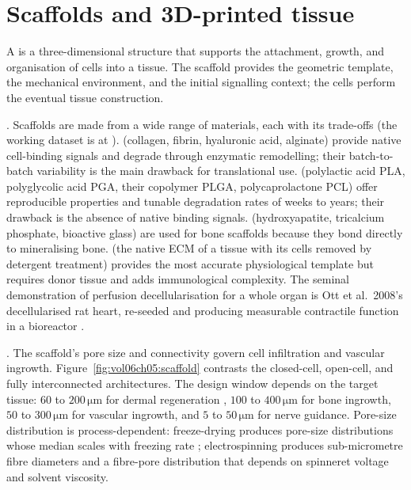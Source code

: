 \section{Scaffolds and 3D-printed tissue}

A  is a three-dimensional structure that supports
the attachment, growth, and organisation of cells into a tissue. The
scaffold provides the geometric template, the mechanical environment,
and the initial signalling context; the cells perform the eventual
tissue construction.

. Scaffolds are made from a wide range of
materials, each with its trade-offs (the working dataset is at
). 
(collagen, fibrin, hyaluronic acid, alginate) provide native cell-binding
signals and degrade through enzymatic remodelling; their batch-to-batch
variability is the main drawback for translational use.
 (polylactic acid PLA, polyglycolic acid
PGA, their copolymer PLGA, polycaprolactone PCL) offer reproducible
properties and tunable degradation rates of weeks to years; their
drawback is the absence of native binding signals. 
(hydroxyapatite, tricalcium phosphate, bioactive glass) are used for
bone scaffolds because they bond directly to mineralising bone.
 (the native ECM of a tissue with its
cells removed by detergent treatment) provides the most accurate
physiological template but requires donor tissue and adds
immunological complexity. The seminal demonstration of perfusion
decellularisation for a whole organ is Ott et al.\ 2008's
decellularised rat heart, re-seeded and producing measurable
contractile function in a bioreactor \cite{paper:v6c05-ott-decellularised-heart-2008}.

. The scaffold's pore size and
connectivity govern cell infiltration and vascular ingrowth.
Figure~\ref{fig:vol06ch05:scaffold} contrasts the closed-cell,
open-cell, and fully interconnected architectures. The design window
depends on the target tissue: $60$ to $200\,\si{\micro\meter}$ for
dermal regeneration \cite{paper:v6c05-yannas-burn-1980},
$100$ to $400\,\si{\micro\meter}$ for bone ingrowth,
$50$ to $300\,\si{\micro\meter}$ for vascular ingrowth, and
$5$ to $50\,\si{\micro\meter}$ for nerve guidance. Pore-size
distribution is process-dependent: freeze-drying produces pore-size
distributions whose median scales with freezing rate
\cite{paper:v6c05-pruitt-pore-size-1994}; electrospinning produces
sub-micrometre fibre diameters and a fibre-pore distribution that
depends on spinneret voltage and solvent viscosity.

